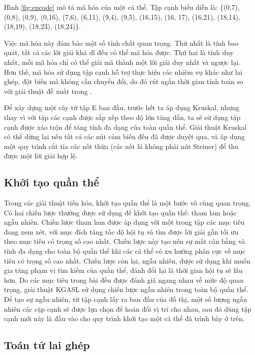 \documentclass{hust}
\begin{document}
Hình \ref{fig:encode} mô tả mã hóa của một cá thể. Tập cạnh biểu diễn là: \{(0,7), (0,8), (0,9), (0,16), (7,6), (6,11), (9,4), (9,5), (16,15), (16, 17), (16,21), (18,14), (18,19), (18,23), (18,24)\}.


Việc mã hóa này đảm bảo một số tính chất quan trọng. Thứ nhất là tính bao quát, tất cả các lời giải khả dĩ đều có thể mã hóa được. Thứ hai là tính duy nhất, mỗi mã hóa chỉ có thể giải mã thành một lời giải duy nhất và ngược lại. Hơn thế, mã hóa sử dụng tập cạnh hỗ trợ thực hiện các nhiệm vụ khác như lai ghép, đột biến mà không cần chuyển đổi, do đó rút ngắn thời gian tính toán so với giải thuật đề xuất trong \cite{lu2014construction}.


Để xây dựng một cây từ tập E ban đầu, trước hết ta áp dụng Kruskal, nhưng thay vì với tập các cạnh được sắp xếp theo độ lớn tăng dần, ta sẽ sử dụng tập cạnh được xáo trộn để tăng tính đa dạng của toàn quần thể. Giải thuật Kruskal có thể dừng lại nếu tất cả các nút cảm biến đều đã được duyệt qua, và áp dụng một quy trình cắt tỉa các nốt thừa (các nốt lá không phải nút Steiner) để thu được một lời giải hợp lệ.


\subsection{Khởi tạo quần thể} \label{initialization}

Trong các giải thuật tiến hóa, khởi tạo quần thể là một bước vô cùng quan trọng. Có hai chiến lược thường được sử dụng để khởi tạo quần thể: tham lam hoặc ngẫu nhiên. Chiến lược tham lam được áp dụng với một trong tập các mục tiêu đang xem xét, với mục đích tăng tốc độ hội tụ và tìm được lời giải gần tối ưu theo mục tiêu có trọng số cao nhất. Chiến lược này tạo nên sự mất cân bằng và tính đa dạng cho toàn bộ quần thể khi các cá thể có xu hướng phân cực về mục tiêu có trọng số cao nhất. Chiến lược còn lại, ngẫu nhiên, được sử dụng khi muốn gia tăng phạm vi tìm kiếm của quần thể, đánh đổi lại là thời gian hội tụ sẽ lâu hơn.
Do các mục tiêu trong bài đều được đánh giá ngang nhau về mức độ quan trọng, giải thuật KGASL sử dụng chiến lược ngẫu nhiên trong toàn bộ quần thể. Để tạo sự ngẫu nhiên, từ tập cạnh lấy ra ban đầu của đồ thị, một số lượng ngẫu nhiên các cặp cạnh sẽ được lựa chọn để hoán đổi vị trí cho nhau, sau đó dùng tập cạnh mới này là đầu vào cho quy trình khởi tạo một cá thể đã trình bày ở trên.


\subsection{Toán tử lai ghép} \label{crossover}
\end{document}
